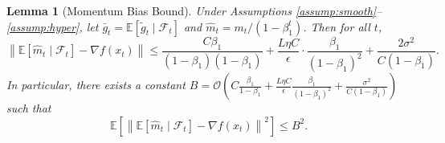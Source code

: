 \documentclass{article}
\newtheorem{lemma}{Lemma}
\newcommand{\E}{\mathbb{E}}
\newcommand{\norm}[1]{\left\| #1 \right\|}
\begin{document}
\begin{lemma}[Momentum Bias Bound] \label{lem:momentum_bias}
    Under Assumptions \ref{assump:smooth}--\ref{assump:hyper}, let $\bar{g}_t = \E[\tilde{g}_t \mid \mathcal{F}_t]$ and $\hat{m}_t = m_t/(1-\beta_1^t)$. Then for all $t$,
    \[
        \norm{\E[\hat{m}_t \mid \mathcal{F}_t] - \nabla f(x_t)} \le \frac{C \beta_1}{(1-\beta_1)(1-\beta_1)} + \frac{L \eta C}{\epsilon} \cdot \frac{\beta_1}{(1-\beta_1)^2} + \frac{2\sigma^2}{C(1-\beta_1)}.
    \]
    In particular, there exists a constant $B = \mathcal{O}\left(C \frac{\beta_1}{1-\beta_1} + \frac{L \eta C}{\epsilon} \frac{\beta_1}{(1-\beta_1)^2} + \frac{\sigma^2}{C(1-\beta_1)}\right)$ such that
    \[
        \E\left[ \norm{\E[\hat{m}_t \mid \mathcal{F}_t] - \nabla f(x_t)}^2 \right] \le B^2.
    \]
\end{lemma}
\end{document}
